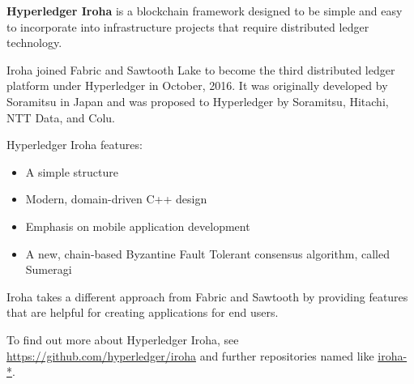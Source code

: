 \textbf{Hyperledger Iroha} is a blockchain framework designed to be simple and easy to incorporate into infrastructure projects that require distributed ledger technology. 

Iroha joined Fabric and Sawtooth Lake to become the third distributed ledger platform under Hyperledger in October, 2016. It was originally developed by Soramitsu in Japan and was proposed to Hyperledger by Soramitsu, Hitachi, NTT Data, and Colu.

Hyperledger Iroha features:
\begin{itemize}
\item A simple structure
\item Modern, domain-driven C++ design
\item Emphasis on mobile application development
\item A new, chain-based Byzantine Fault Tolerant consensus algorithm, called Sumeragi 
\end{itemize}

Iroha takes a different approach from Fabric and Sawtooth by providing features that are helpful for creating applications for end users. 

To find out more about Hyperledger Iroha, see \url{https://github.com/hyperledger/iroha} and further repositories named like \url{iroha-*}.
